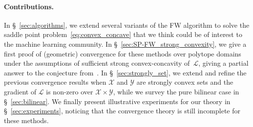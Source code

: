 \documentclass[twoside]{article}
\renewcommand{\L}{\mathcal{L}}
\newcommand{\X}{\mathcal{X}}
\newcommand{\Y}{\mathcal{Y}}
\newcommand{\0}{\mathbf{0}} %
\begin{document}
\vspace{-1.5mm}
\paragraph{Contributions.}
In \S~\ref{sec:algorithms}, we extend several variants of the FW algorithm to solve the saddle point problem~\eqref{eq:convex_concave} that we think could be of interest to the machine learning community. 
In \S~\ref{sec:SP-FW_strong_convexity}, we give a first proof of (geometric) convergence for these methods over polytope domains under the assumptions of sufficient strong convex-concavity of~$\L$, giving a partial answer to the conjecture from~\citet{hammond1984solving}. 
In \S~\ref{sec:strongly_set}, we extend and refine the previous convergence results when $\X$ and $\Y$ are strongly convex sets and the gradient of $\L$ is non-zero over $\X \times \Y$, while we survey the pure bilinear case in \S~\ref{sec:bilinear}.
We finally present illustrative experiments for our theory in \S~\ref{sec:experiments}, noticing that the convergence theory is still incomplete for these methods.




%
%
%
\end{document}
